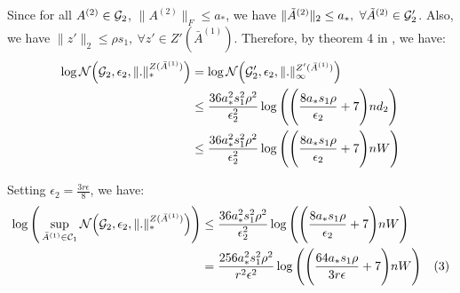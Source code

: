 \noindent Since for all $A^{(2)}\in \mathcal{G}_2$, $\|A^{(2)}\|_F\le a_*$, we have $\|\tilde A^{(2)}\|_2\le a_*, \ \forall \tilde A^{(2)} \in \G_2'$. Also, we have $\|z'\|_2\le \rho s_1, \ \forall z'\in Z'(\bar A^{(1)})$. Therefore, by theorem 4 in \cite{article:tong_zhang}, we have:
\begin{align*}
    \log\mathcal{N}\Big( \mathcal{G}_2, \epsilon_2, \|.\|_*^{Z(\bar A^{(1)})} \Big) &= \log\mathcal{N}\Big( \mathcal{G}_2', \epsilon_2, \|.\|_\infty^{Z'(\bar A^{(1)})} \Big) \\
        &\le \frac{36a_*^2s_1^2\rho^2}{\epsilon_2^2} \log\Bigg( 
            \Bigg( 
                \frac{8a_*s_1\rho}{\epsilon_2} + 7
             \Bigg)nd_2
         \Bigg) \\
        &\le \frac{36a_*^2s_1^2\rho^2}{\epsilon_2^2} \log\Bigg( 
            \Bigg( 
                \frac{8a_*s_1\rho}{\epsilon_2} + 7
             \Bigg)nW
         \Bigg)
\end{align*}
        
\noindent Setting $\epsilon_2 = \frac{3r\epsilon}{8}$, we have:
\begin{align*}
    \log\Bigg( 
        \sup_{\bar A^{(1)} \in \mathcal{C}_1} \mathcal{N}\Big( \mathcal{G}_2, \epsilon_2, \|.\|_*^{Z(\bar A^{(1)})} \Big)
     \Bigg) &\le \frac{36a_*^2s_1^2\rho^2}{\epsilon_2^2} \log\Bigg( 
        \Bigg( 
            \frac{8a_*s_1\rho}{\epsilon_2} + 7
         \Bigg)nW
     \Bigg) \\
    &= \frac{256a_*^2s_1^2\rho^2}{r^2\epsilon^2} \log\Bigg( 
        \Bigg( 
            \frac{64a_*s_1\rho}{3r\epsilon} + 7
         \Bigg)nW
     \Bigg) \ \ \ (3)
\end{align*}


